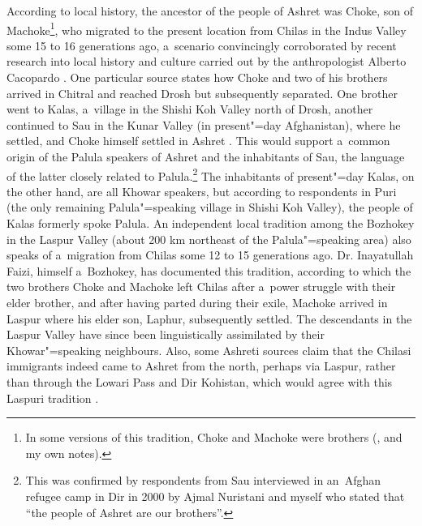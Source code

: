 According to local history, the ancestor of the people of Ashret was Choke, son of
Machoke\footnote{In some versions of this tradition, Choke and Machoke were brothers
  (\citealt[85]{cacopardo2001}, and my own notes).}, who migrated to the present location from
Chilas in the Indus Valley some 15 to 16 generations ago, a~scenario convincingly corroborated by
recent research into local history and culture carried out by the anthropologist Alberto Cacopardo
\citep[84--93]{cacopardo2001}. One particular source states how Choke and two of his brothers
arrived in Chitral and reached Drosh but subsequently separated. One brother went to Kalas,
a~village in the Shishi Koh Valley north of Drosh, another continued to Sau in the Kunar Valley (in
present"=day Afghanistan), where he settled, and Choke himself settled in Ashret
\citep[84]{cacopardo2001}. This would support a~common origin of the Palula speakers of Ashret and
the inhabitants of Sau, the language of the latter closely related to Palula.\footnote{This was
  confirmed by respondents from Sau interviewed in an~Afghan refugee camp in Dir in 2000 by Ajmal
  Nuristani and myself who stated that ``the people of Ashret are our brothers''.} The inhabitants
of present"=day Kalas, on the other hand, are all Khowar speakers, but according to respondents in
Puri (the only remaining Palula"=speaking village in Shishi Koh Valley), the people of Kalas formerly
spoke Palula. An independent local tradition among the Bozhokey in the Laspur Valley (about 200 km
northeast of the Palula"=speaking area) also speaks of a~migration from Chilas some 12 to 15
generations ago. Dr. Inayatullah Faizi, himself a~Bozhokey, has documented this tradition, according
to which the two brothers Choke and Machoke left Chilas after a~power struggle with their elder
brother, and after having parted during their exile, Machoke arrived in Laspur where his elder son,
Laphur, subsequently settled. The descendants in the Laspur Valley have since been linguistically
assimilated by their Khowar"=speaking neighbours. Also, some Ashreti sources claim that the Chilasi
immigrants indeed came to Ashret from the north, perhaps via Laspur, rather than through the Lowari
Pass and Dir Kohistan, which would agree with this Laspuri tradition \citep[85, 125--126]{cacopardo2001}.


